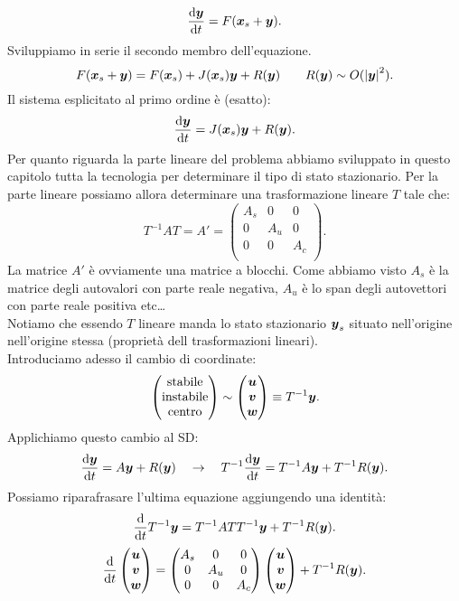 \[
    \frac{\text{d} \boldsymbol{y}}{\text{d} t} = F(\boldsymbol{x}_s + \boldsymbol{y}) 
.\] 
Sviluppiamo in serie il secondo membro dell'equazione.
\[
    F(\boldsymbol{x}_s + \boldsymbol{y}) = F(\boldsymbol{x}_s) + J(\boldsymbol{x}_s) \boldsymbol{y} + R(\boldsymbol{y}) \qquad R(\boldsymbol{y}) \sim O(\left|\boldsymbol{y}\right|^2) 
.\] 
Il sistema esplicitato al primo ordine è (esatto):
\[
    \frac{\text{d} \boldsymbol{y}}{\text{d} t} = J(\boldsymbol{x}_s) \boldsymbol{y} + R(\boldsymbol{y}) 
.\] 
Per quanto riguarda la parte lineare del problema abbiamo sviluppato in questo capitolo tutta la tecnologia per determinare il tipo di stato stazionario. Per la parte lineare possiamo allora determinare una trasformazione lineare $T$ tale che:
\[
    T^{-1}A T = A' = 
\begin{pmatrix}
    A_s & 0 & 0 \\
    0 & A_u & 0 \\
    0 & 0 & A_c \\
\end{pmatrix}
.\] 
La matrice $A'$ è ovviamente una matrice a blocchi. Come abbiamo visto $A_s$ è la matrice degli autovalori con parte reale negativa, $A_u$ è lo span degli autovettori con parte reale positiva etc\ldots\\
Notiamo che essendo $T$ lineare manda lo stato stazionario $\boldsymbol{y}_s$ situato nell'origine nell'origine stessa (proprietà dell trasformazioni lineari).\\
Introduciamo adesso il cambio di coordinate:
\[
    \begin{pmatrix} \text{stabile} \\ \text{instabile}\\ \text{centro} \end{pmatrix} \sim 
    \begin{pmatrix} \boldsymbol{u} \\ \boldsymbol{v}\\ \boldsymbol{w} \end{pmatrix} \equiv 
    T^{-1}\boldsymbol{y}
.\] 
Applichiamo questo cambio al SD:
\[
    \frac{\text{d} \boldsymbol{y}}{\text{d} t} = A \boldsymbol{y} + R(\boldsymbol{y}) \quad\to \quad
    T^{-1}\frac{\text{d} \boldsymbol{y}}{\text{d} t} = T^{-1}A \boldsymbol{y} + T^{-1}R(\boldsymbol{y}) 
.\] 
Possiamo riparafrasare l'ultima equazione aggiungendo una identità:
\[
    \frac{\text{d} }{\text{d} t} T^{-1}\boldsymbol{y} = T^{-1}A TT^{-1}\boldsymbol{y} + T^{-1}R(\boldsymbol{y}) 
.\] 
\[
    \frac{\text{d} }{\text{d} t} \begin{pmatrix} \boldsymbol{u} \\ \boldsymbol{v}\\ \boldsymbol{w} \end{pmatrix} = 
    \begin{pmatrix}
        A_s & 0 & 0 \\
        0 & A_u & 0 \\
        0 & 0 & A_c \\
    \end{pmatrix}
    \begin{pmatrix} \boldsymbol{u} \\ \boldsymbol{v}\\\boldsymbol{w} \end{pmatrix}
    + T^{-1}R(\boldsymbol{y}) 
.\] 
